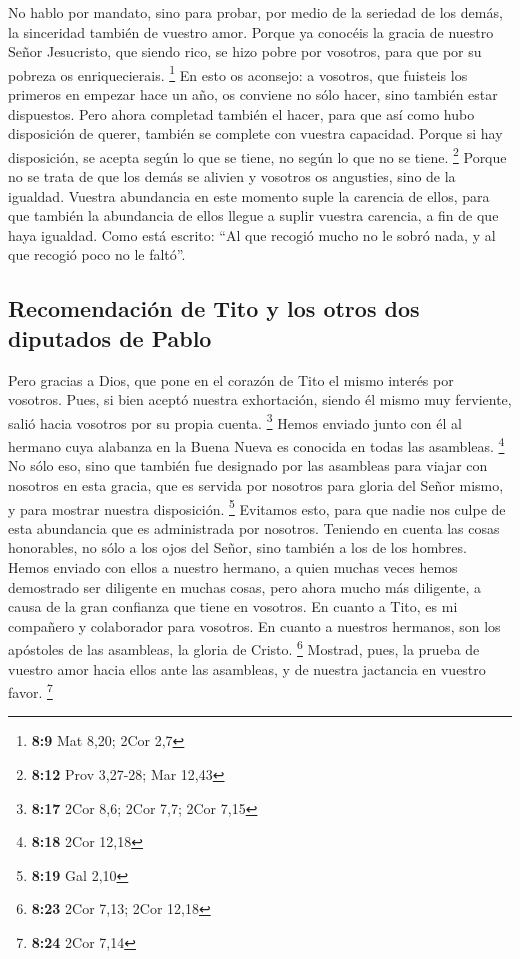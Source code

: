  No hablo por mandato, sino para probar, por medio de la
seriedad de los demás, la sinceridad también de vuestro amor.
 Porque ya conocéis la gracia de nuestro Señor Jesucristo,
que siendo rico, se hizo pobre por vosotros, para que por su pobreza os
enriquecierais. \footnote{\textbf{8:9} Mat 8,20; 2Cor 2,7}
 En esto os aconsejo: a vosotros, que fuisteis los
primeros en empezar hace un año, os conviene no sólo hacer, sino también
estar dispuestos.  Pero ahora completad también el hacer,
para que así como hubo disposición de querer, también se complete con
vuestra capacidad.  Porque si hay disposición, se acepta
según lo que se tiene, no según lo que no se tiene. \footnote{\textbf{8:12}
  Prov 3,27-28; Mar 12,43}  Porque no se trata de que los
demás se alivien y vosotros os angusties,  sino de la
igualdad. Vuestra abundancia en este momento suple la carencia de ellos,
para que también la abundancia de ellos llegue a suplir vuestra
carencia, a fin de que haya igualdad.  Como está escrito:
``Al que recogió mucho no le sobró nada, y al que recogió poco no le
faltó''.

\hypertarget{recomendaciuxf3n-de-tito-y-los-otros-dos-diputados-de-pablo}{%
\subsection{Recomendación de Tito y los otros dos diputados de
Pablo}\label{recomendaciuxf3n-de-tito-y-los-otros-dos-diputados-de-pablo}}

 Pero gracias a Dios, que pone en el corazón de Tito el
mismo interés por vosotros.  Pues, si bien aceptó nuestra
exhortación, siendo él mismo muy ferviente, salió hacia vosotros por su
propia cuenta. \footnote{\textbf{8:17} 2Cor 8,6; 2Cor 7,7; 2Cor 7,15}
 Hemos enviado junto con él al hermano cuya alabanza en
la Buena Nueva es conocida en todas las asambleas. \footnote{\textbf{8:18}
  2Cor 12,18}  No sólo eso, sino que también fue
designado por las asambleas para viajar con nosotros en esta gracia, que
es servida por nosotros para gloria del Señor mismo, y para mostrar
nuestra disposición. \footnote{\textbf{8:19} Gal 2,10} 
Evitamos esto, para que nadie nos culpe de esta abundancia que es
administrada por nosotros.  Teniendo en cuenta las cosas
honorables, no sólo a los ojos del Señor, sino también a los de los
hombres.  Hemos enviado con ellos a nuestro hermano, a
quien muchas veces hemos demostrado ser diligente en muchas cosas, pero
ahora mucho más diligente, a causa de la gran confianza que tiene en
vosotros.  En cuanto a Tito, es mi compañero y
colaborador para vosotros. En cuanto a nuestros hermanos, son los
apóstoles de las asambleas, la gloria de Cristo. \footnote{\textbf{8:23}
  2Cor 7,13; 2Cor 12,18}  Mostrad, pues, la prueba de
vuestro amor hacia ellos ante las asambleas, y de nuestra jactancia en
vuestro favor. \footnote{\textbf{8:24} 2Cor 7,14}

